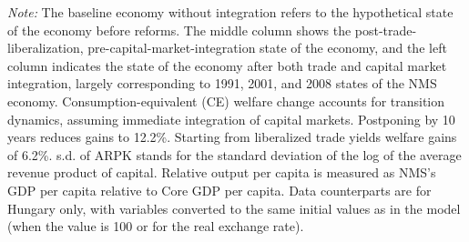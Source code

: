 \begin{table}[!ht]
\parbox{0.90\textwidth}{\caption*{\scriptsize \textit{Note:} The baseline economy without integration refers to the hypothetical state of the economy before reforms. The middle column shows the post-trade-liberalization, pre-capital-market-integration state of the economy, and the left column indicates the state of the economy after both trade and capital market integration, largely corresponding to 1991, 2001, and 2008 states of the NMS economy. Consumption-equivalent (CE) welfare change accounts for transition dynamics, assuming immediate integration of capital markets. Postponing by 10 years reduces gains to 12.2\%. Starting from liberalized trade yields welfare gains of 6.2\%. s.d. of ARPK stands for the standard deviation of the log of the average revenue product of capital. Relative output per capita is measured as NMS's GDP per capita relative to Core GDP per capita. Data counterparts are for Hungary only, with variables converted to the same initial values as in the model (when the value is 100 or for the real exchange rate).}}
\end{table}
